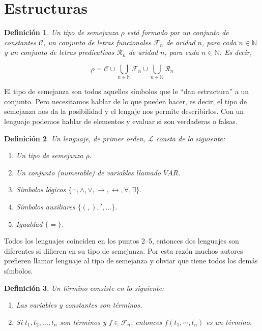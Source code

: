 \documentclass[fc]{tarea}
\newtheorem{definition}{Definición}[chapter]
\begin{document}
\chapter*{Estructuras}
\begin{definition}
Un tipo de semejanza $\rho$ está formado por un conjunto de constantes $\mathcal{C}$, un conjunto de letras funcionales $\mathcal{F}_n$ de aridad $n$, para cada 
$n \in \mathbb{N}$ y un conjunto de letras predicativas $\mathcal{R}_n$ de aridad $n$, para cada $n \in \mathbb{N}$. Es decir,

$$\rho = \mathcal{C} \cup \bigcup_{n \in \mathbb{N}} \mathcal{F}_n \cup \bigcup_{n \in \mathbb{N}} \mathcal{R}_n$$
\end{definition}

El tipo de semejanza son todos aquellos símbolos que le ``dan estructura'' a un conjunto. Pero necesitamos hablar de lo que pueden hacer, es decir, el tipo de
semejanza nos da la posibilidad y el lengaje nos permite describirlos. Con un lenguaje podemos hablar de elementos y evaluar si son verdaderas o falsas.

\begin{definition}
Un lenguaje, de primer orden, $\mathcal{L}$ consta de lo siguiente:

\begin{enumerate}
    \item Un tipo de semejanza $\rho$.
    \item Un conjunto (numerable) de variables llamado $VAR$.
    \item Símbolos lógicos $\{\neg, \land, \lor, \to, \leftrightarrow, \forall, \exists\}$.
    \item Símbolos auxiliares $\{(, ), ', \dots\}$.
    \item Igualdad $\{=\}$.
\end{enumerate}
\end{definition}

Todos los lenguajes coinciden en los puntos 2–5, entonces dos lenguajes son diferentes si difieren en su tipo de semejanza. Por esta razón muchos autores 
prefieren llamar lenguaje al tipo de semejanza y obviar que tiene todos los demás símbolos.

\begin{definition}
  Un término consiste en lo siguiente:
  \begin{enumerate}
    \item Las variables y constantes son términos.
    \item Si $t_1, t_2, \dots, t_n$ son términos y $f\in \mathcal{F}_n$, entonces $f(t_1,\cdots, t_n)$ es un término.
  \end{enumerate}
\end{definition}
\end{document}

